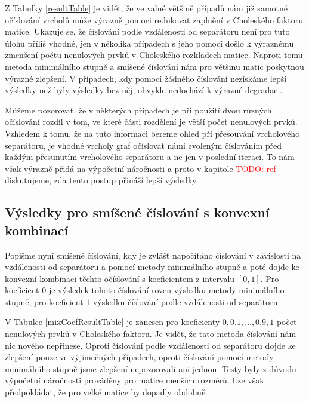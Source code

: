 \documentclass[11pt,american,czech,oneside]{book}
\theoremstyle{plain}
\theoremstyle{definition}
\newcommand{\TODO}[1]{\textcolor{red}{TODO: #1}}
\begin{document}
Z Tabulky \ref{resultTable} je vidět, že ve valné většině případů nám již samotné očíslování vrcholů může výrazně pomoci redukovat zaplnění v Choleského faktoru matice. Ukazuje se, že číslování podle vzdálenosti od separátoru není pro tuto úlohu příliš vhodné, jen v několika případech s jeho pomocí došlo k výraznému zmenšení počtu nenulových prvků v Choleského rozkladech matice. Naproti tomu metoda minimálního stupně a smíšené číslování nám pro většinu matic poskytnou výrazné zlepšení. V případech, kdy pomocí žádného číslování nezískáme lepší výsledky než byly výsledky bez něj, obvykle nedochází k výrazné degradaci.

Můžeme pozorovat, že v některých případech je při použití dvou různých očíslování rozdíl v tom, ve které části rozdělení je větší počet nenulových prvků. Vzhledem k tomu, že na tuto informaci bereme ohled při přesouvání vrcholového separátoru, je vhodné vrcholy graf očíslovat námi zvoleným číslováním před každým přesunutím vrcholového separátoru a ne jen v poslední iteraci. To nám však výrazně přidá na výpočetní náročnosti a proto v kapitole \TODO{ref} diskutujeme, zda tento postup přináší lepší výsledky.

\subsection{Výsledky pro smíšené číslování s konvexní kombinací}

Popišme nyní smíšené číslování, kdy je zvlášť napočítáno číslování v závislosti na vzdálenosti od separátoru a pomocí metody minimálního stupně a poté dojde ke konvexní kombinaci těchto očíslování s koeficientem z intervalu $[0,1]$. Pro koeficient $0$ je výsledek tohoto číslování roven výsledku metody minimálního stupně, pro koeficient $1$ výsledku číslování podle vzdálenosti od separátoru.

V Tabulce \ref{mixCoefResultTable} je zanesen pro koeficienty $0, 0.1,\ldots,0.9, 1$ počet nenulových prvků v Choleského faktoru. Je vidět, že tato metoda číslování nám nic nového nepřinese. Oproti číslování podle vzdálenosti od separátoru dojde ke zlepšení pouze ve výjimečných případech, oproti číslování pomocí metody minimálního stupně jsme zlepšení nepozorovali ani jednou. Testy byly z důvodu výpočetní náročnosti prováděny pro matice menších rozměrů. Lze však předpokládat, že pro velké matice by dopadly obdobně.
\end{document}
